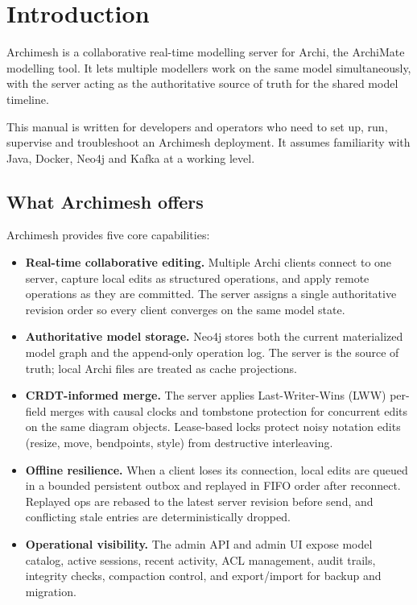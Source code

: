 \section{Introduction}
\label{sec:Introduction}

Archimesh is a collaborative real-time modelling server for Archi, the ArchiMate
modelling tool. It lets multiple modellers work on the same model simultaneously,
with the server acting as the authoritative source of truth for the shared model
timeline.

This manual is written for developers and operators who need to set up, run,
supervise and troubleshoot an Archimesh deployment. It assumes familiarity with
Java, Docker, Neo4j and Kafka at a working level.

\subsection{What Archimesh offers}

Archimesh provides five core capabilities:

\begin{itemize}
\item \textbf{Real-time collaborative editing.} Multiple Archi clients connect to
  one server, capture local edits as structured operations, and apply remote
  operations as they are committed. The server assigns a single authoritative
  revision order so every client converges on the same model state.

\item \textbf{Authoritative model storage.} Neo4j stores both the current
  materialized model graph and the append-only operation log. The server is the
  source of truth; local Archi files are treated as cache projections.

\item \textbf{CRDT-informed merge.} The server applies Last-Writer-Wins (LWW)
  per-field merges with causal clocks and tombstone protection for concurrent
  edits on the same diagram objects. Lease-based locks protect noisy notation
  edits (resize, move, bendpoints, style) from destructive interleaving.

\item \textbf{Offline resilience.} When a client loses its connection, local
  edits are queued in a bounded persistent outbox and replayed in FIFO order
  after reconnect. Replayed ops are rebased to the latest server revision before
  send, and conflicting stale entries are deterministically dropped.

\item \textbf{Operational visibility.} The admin API and admin UI expose model
  catalog, active sessions, recent activity, ACL management, audit trails,
  integrity checks, compaction control, and export/import for backup and
  migration.

\end{itemize}

